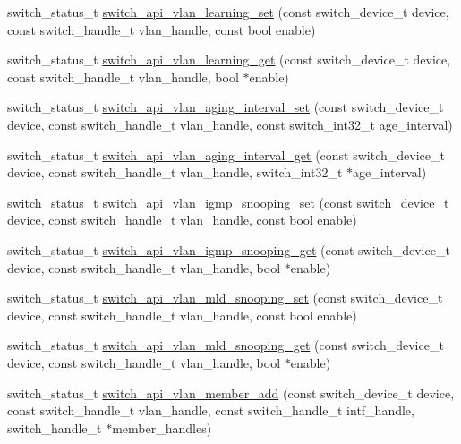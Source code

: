 \begin{DoxyCompactItemize}
\item 
switch\+\_\+status\+\_\+t \hyperlink{group__VLAN_ga3c56613edcd857a1acf584b32243adca}{switch\+\_\+api\+\_\+vlan\+\_\+learning\+\_\+set} (const switch\+\_\+device\+\_\+t device, const switch\+\_\+handle\+\_\+t vlan\+\_\+handle, const bool enable)
\item 
switch\+\_\+status\+\_\+t \hyperlink{group__VLAN_gaf4e308e262c09faf863edeb40f8303c7}{switch\+\_\+api\+\_\+vlan\+\_\+learning\+\_\+get} (const switch\+\_\+device\+\_\+t device, const switch\+\_\+handle\+\_\+t vlan\+\_\+handle, bool $\ast$enable)
\item 
switch\+\_\+status\+\_\+t \hyperlink{group__VLAN_ga7191d184ab3caacf45007a06ef11ae7b}{switch\+\_\+api\+\_\+vlan\+\_\+aging\+\_\+interval\+\_\+set} (const switch\+\_\+device\+\_\+t device, const switch\+\_\+handle\+\_\+t vlan\+\_\+handle, const switch\+\_\+int32\+\_\+t age\+\_\+interval)
\item 
switch\+\_\+status\+\_\+t \hyperlink{group__VLAN_ga59121c6d479d4392d3b7dfcfe57e06dd}{switch\+\_\+api\+\_\+vlan\+\_\+aging\+\_\+interval\+\_\+get} (const switch\+\_\+device\+\_\+t device, const switch\+\_\+handle\+\_\+t vlan\+\_\+handle, switch\+\_\+int32\+\_\+t $\ast$age\+\_\+interval)
\item 
switch\+\_\+status\+\_\+t \hyperlink{group__VLAN_ga19c763e4390f3e91027301e0c9c8307e}{switch\+\_\+api\+\_\+vlan\+\_\+igmp\+\_\+snooping\+\_\+set} (const switch\+\_\+device\+\_\+t device, const switch\+\_\+handle\+\_\+t vlan\+\_\+handle, const bool enable)
\item 
switch\+\_\+status\+\_\+t \hyperlink{group__VLAN_gac885b45961e8af94f1914a27f71e7a9c}{switch\+\_\+api\+\_\+vlan\+\_\+igmp\+\_\+snooping\+\_\+get} (const switch\+\_\+device\+\_\+t device, const switch\+\_\+handle\+\_\+t vlan\+\_\+handle, bool $\ast$enable)
\item 
switch\+\_\+status\+\_\+t \hyperlink{group__VLAN_gac33613f678384471b8eb4a7927c0f5bb}{switch\+\_\+api\+\_\+vlan\+\_\+mld\+\_\+snooping\+\_\+set} (const switch\+\_\+device\+\_\+t device, const switch\+\_\+handle\+\_\+t vlan\+\_\+handle, const bool enable)
\item 
switch\+\_\+status\+\_\+t \hyperlink{group__VLAN_gaf556ecb7766d84dff5f3f4de1d32766f}{switch\+\_\+api\+\_\+vlan\+\_\+mld\+\_\+snooping\+\_\+get} (const switch\+\_\+device\+\_\+t device, const switch\+\_\+handle\+\_\+t vlan\+\_\+handle, bool $\ast$enable)
\item 
switch\+\_\+status\+\_\+t \hyperlink{group__VLAN_ga846586f529673556b314c2cce430ba1e}{switch\+\_\+api\+\_\+vlan\+\_\+member\+\_\+add} (const switch\+\_\+device\+\_\+t device, const switch\+\_\+handle\+\_\+t vlan\+\_\+handle, const switch\+\_\+handle\+\_\+t intf\+\_\+handle, switch\+\_\+handle\+\_\+t $\ast$member\+\_\+handles)

\end{DoxyCompactItemize}
